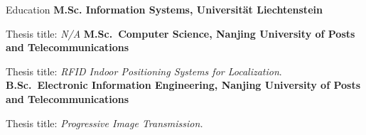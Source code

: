 \begin{rubric}{Education}
\entry*[2024 -- now]%
    \textbf{M.Sc. Information Systems, Universit\"at Liechtenstein}
    \par Thesis title: \emph{N/A}
%
\entry*[2020 -- 2023]%
	\textbf{M.Sc.~Computer Science, Nanjing University of Posts and Telecommunications}\par
	Thesis title: \emph{RFID Indoor Positioning Systems for Localization}.
% 
\entry*[2016 -- 2020]%
	\textbf{B.Sc.~Electronic Information Engineering, Nanjing University of Posts and Telecommunications}\par
	Thesis title: \emph{Progressive Image Transmission.}
\end{rubric}